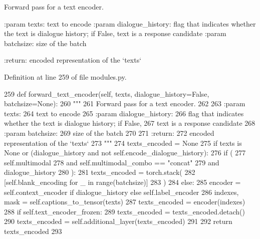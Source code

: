 \begin{DoxyVerb}Forward pass for a text encoder.

:param texts:
    text to encode
:param dialogue_history:
    flag that indicates whether the text is dialogue history; if False,
    text is a response candidate
:param batchsize:
    size of the batch

:return:
    encoded representation of the `texts`
\end{DoxyVerb}
 

Definition at line 259 of file modules.\+py.


\begin{DoxyCode}
259     \textcolor{keyword}{def }forward\_text\_encoder(self, texts, dialogue\_history=False, batchsize=None):
260         \textcolor{stringliteral}{"""}
261 \textcolor{stringliteral}{        Forward pass for a text encoder.}
262 \textcolor{stringliteral}{}
263 \textcolor{stringliteral}{        :param texts:}
264 \textcolor{stringliteral}{            text to encode}
265 \textcolor{stringliteral}{        :param dialogue\_history:}
266 \textcolor{stringliteral}{            flag that indicates whether the text is dialogue history; if False,}
267 \textcolor{stringliteral}{            text is a response candidate}
268 \textcolor{stringliteral}{        :param batchsize:}
269 \textcolor{stringliteral}{            size of the batch}
270 \textcolor{stringliteral}{}
271 \textcolor{stringliteral}{        :return:}
272 \textcolor{stringliteral}{            encoded representation of the `texts`}
273 \textcolor{stringliteral}{        """}
274         texts\_encoded = \textcolor{keywordtype}{None}
275         \textcolor{keywordflow}{if} texts \textcolor{keywordflow}{is} \textcolor{keywordtype}{None} \textcolor{keywordflow}{or} (dialogue\_history \textcolor{keywordflow}{and} \textcolor{keywordflow}{not} self.encode\_dialogue\_history):
276             \textcolor{keywordflow}{if} (
277                 self.multimodal
278                 \textcolor{keywordflow}{and} self.multimodal\_combo == \textcolor{stringliteral}{"concat"}
279                 \textcolor{keywordflow}{and} dialogue\_history
280             ):
281                 texts\_encoded = torch.stack(
282                     [self.blank\_encoding \textcolor{keywordflow}{for} \_ \textcolor{keywordflow}{in} range(batchsize)]
283                 )
284         \textcolor{keywordflow}{else}:
285             encoder = self.context\_encoder \textcolor{keywordflow}{if} dialogue\_history \textcolor{keywordflow}{else} self.label\_encoder
286             indexes, mask = self.captions\_to\_tensor(texts)
287             texts\_encoded = encoder(indexes)
288             \textcolor{keywordflow}{if} self.text\_encoder\_frozen:
289                 texts\_encoded = texts\_encoded.detach()
290             texts\_encoded = self.additional\_layer(texts\_encoded)
291 
292         \textcolor{keywordflow}{return} texts\_encoded
293 
\end{DoxyCode}
